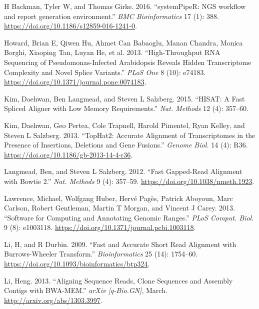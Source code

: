 \documentclass[14pt,]{article}
\begin{document}
\hypertarget{refs}{}
\begin{CSLReferences}{1}{0}
\leavevmode\hypertarget{ref-H_Backman2016-bt}{}%
H Backman, Tyler W, and Thomas Girke. 2016. {``{systemPipeR: NGS workflow and report generation environment}.''} \emph{BMC Bioinformatics} 17 (1): 388. \url{https://doi.org/10.1186/s12859-016-1241-0}.

\leavevmode\hypertarget{ref-Howard2013-fq}{}%
Howard, Brian E, Qiwen Hu, Ahmet Can Babaoglu, Manan Chandra, Monica Borghi, Xiaoping Tan, Luyan He, et al. 2013. {``High-Throughput {RNA} Sequencing of Pseudomonas-Infected Arabidopsis Reveals Hidden Transcriptome Complexity and Novel Splice Variants.''} \emph{PLoS One} 8 (10): e74183. \url{https://doi.org/10.1371/journal.pone.0074183}.

\leavevmode\hypertarget{ref-Kim2015-ve}{}%
Kim, Daehwan, Ben Langmead, and Steven L Salzberg. 2015. {``{HISAT}: A Fast Spliced Aligner with Low Memory Requirements.''} \emph{Nat. Methods} 12 (4): 357--60.

\leavevmode\hypertarget{ref-Kim2013-vg}{}%
Kim, Daehwan, Geo Pertea, Cole Trapnell, Harold Pimentel, Ryan Kelley, and Steven L Salzberg. 2013. {``{TopHat2}: Accurate Alignment of Transcriptomes in the Presence of Insertions, Deletions and Gene Fusions.''} \emph{Genome Biol.} 14 (4): R36. \url{https://doi.org/10.1186/gb-2013-14-4-r36}.

\leavevmode\hypertarget{ref-Langmead2012-bs}{}%
Langmead, Ben, and Steven L Salzberg. 2012. {``Fast Gapped-Read Alignment with Bowtie 2.''} \emph{Nat. Methods} 9 (4): 357--59. \url{https://doi.org/10.1038/nmeth.1923}.

\leavevmode\hypertarget{ref-Lawrence2013-kt}{}%
Lawrence, Michael, Wolfgang Huber, Hervé Pagès, Patrick Aboyoun, Marc Carlson, Robert Gentleman, Martin T Morgan, and Vincent J Carey. 2013. {``Software for Computing and Annotating Genomic Ranges.''} \emph{PLoS Comput. Biol.} 9 (8): e1003118. \url{https://doi.org/10.1371/journal.pcbi.1003118}.

\leavevmode\hypertarget{ref-Li2009-oc}{}%
Li, H, and R Durbin. 2009. {``Fast and Accurate Short Read Alignment with {Burrows-Wheeler} Transform.''} \emph{Bioinformatics} 25 (14): 1754--60. \url{https://doi.org/10.1093/bioinformatics/btp324}.

\leavevmode\hypertarget{ref-Li2013-oy}{}%
Li, Heng. 2013. {``Aligning Sequence Reads, Clone Sequences and Assembly Contigs with {BWA-MEM}.''} \emph{arXiv {[}q-Bio.GN{]}}, March. \url{http://arxiv.org/abs/1303.3997}.


\end{CSLReferences}
\end{document}
